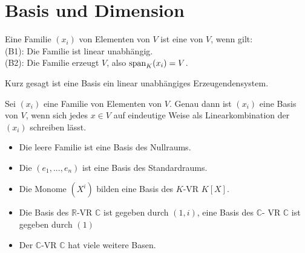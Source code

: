 \section{Basis und Dimension}

\begin{definition}[Basis]
	Eine Familie $(x_i)$ von Elementen von $V$ ist eine  von $V$, wenn gilt: \\
	(B1): Die Familie ist linear unabhängig. \\
	(B2): Die Familie erzeugt $V$, also $\operatorname{span}_K(x_i) = V$.
\end{definition}

\begin{remark}
	Kurz gesagt ist eine Basis ein linear unabhängiges Erzeugendensystem.
\end{remark}

\begin{proposition}
	Sei $(x_i)$ eine Familie von Elementen von $V$. Genau dann ist $(x_i)$ eine Basis von $V$, 
	wenn sich jedes $x \in V$ auf eindeutige Weise als Linearkombination der $(x_i)$ schreiben lässt.
\end{proposition}

\begin{example}
	\begin{itemize}
		\item Die leere Familie ist eine Basis des Nullraums.
		\item Die  $(e_1,...,e_n)$ ist eine Basis des Standardraums.
		\item Die Monome $(X^i)$ bilden eine Basis des $K$-VR $K[X]$.
		\item Die Basis des $\mathbb R$-VR $\mathbb C$ ist gegeben durch $(1,i)$, eine Basis des $\mathbb C$-
		VR $\mathbb C$ ist gegeben durch $(1)$
		\item Der $\mathbb C$-VR $\mathbb C$ hat viele weitere Basen.
	\end{itemize}
\end{example}

